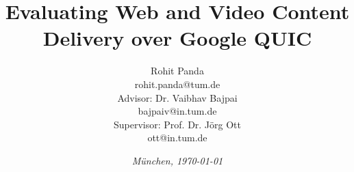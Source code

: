 %
% 
% 
%

\newcommand{\shiftedframetitle}[1]{\frametitle{\\\vspace{-2.5cm}#1}\vspace{0.5cm}}





\renewcommand{\PersonTitel}{}
\newcommand{\Datum}{\today}

\renewcommand{\PraesentationFusszeileZusatz}{| rohit.panda@tum.de | Master's Thesis Presentation}

\title{\textbf{Evaluating Web and Video Content Delivery over Google QUIC}
}

\author{\vspace{2cm} Rohit Panda\\rohit.panda@tum.de \\ 
        \vspace{0.2cm} Advisor: Dr. Vaibhav Bajpai \\ bajpaiv@in.tum.de \\
        \vspace{0.2cm} Supervisor: Prof. Dr. Jörg Ott \\ ott@in.tum.de
    }

\date[]{\textit{M\"unchen, \Datum} }


